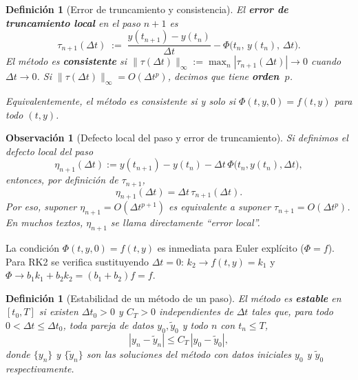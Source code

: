\documentclass[a4paper,11pt]{report}
\newtheorem{definition}[theorem]{Definición}
\newtheorem{remark}[theorem]{Observación}
\begin{document}
\begin{definition}[Error de truncamiento y consistencia]\label{def:consist_pvi_new}
El \textbf{error de truncamiento local} en el paso $n+1$ es
\[
  \tau_{n+1}(\Delta t)\;:=\;\frac{y(t_{n+1})-y(t_n)}{\Delta t}-\Phi\!\bigl(t_n,\,y(t_n),\,\Delta t\bigr).
\]
El método es \textbf{consistente} si $\|\tau(\Delta t)\|_\infty:=\max_n|\tau_{n+1}(\Delta t)|\to0$ cuando $\Delta t\to0$. Si $\|\tau(\Delta t)\|_\infty=O(\Delta t^p)$, decimos que tiene \textbf{orden~$p$}.

Equivalentemente, el método es consistente si y solo si $\Phi(t,y,0)=f(t,y)$ para todo $(t,y)$.
\end{definition}

\begin{remark}[Defecto local del paso y error de truncamiento]
Si definimos el \emph{defecto local del paso}
\[
  \eta_{n+1}(\Delta t):=y(t_{n+1})-y(t_n)-\Delta t\,\Phi\!\bigl(t_n,y(t_n),\Delta t\bigr),
\]
entonces, por definición de $\tau_{n+1}$,
\[
  \eta_{n+1}(\Delta t)=\Delta t\,\tau_{n+1}(\Delta t).
\]
Por eso, suponer $\eta_{n+1}=O(\Delta t^{p+1})$ es equivalente a suponer $\tau_{n+1}=O(\Delta t^p)$. En muchos textos, $\eta_{n+1}$ se llama directamente ``error local''.
\end{remark}

La condición $\Phi(t,y,0)=f(t,y)$ es inmediata para Euler explícito ($\Phi=f$). Para RK2 se verifica sustituyendo $\Delta t=0$: $k_2\to f(t,y)=k_1$ y $\Phi\to b_1 k_1+b_2 k_2=(b_1+b_2)f=f$.

\begin{definition}[Estabilidad de un método de un paso]\label{def:estab_datos_new}
El método es \textbf{estable} en $[t_0,T]$ si existen $\Delta t_0>0$ y $C_T>0$ independientes de $\Delta t$ tales que, para todo $0<\Delta t\le \Delta t_0$, toda pareja de datos $y_0,\tilde y_0$ y todo $n$ con $t_n\le T$,
\[
  |y_n - \tilde y_n| \le C_T\,|y_0 - \tilde y_0|,
\]
donde $\{y_n\}$ y $\{\tilde y_n\}$ son las soluciones del método con datos iniciales $y_0$ y $\tilde y_0$ respectivamente.
\end{definition}
\end{document}
